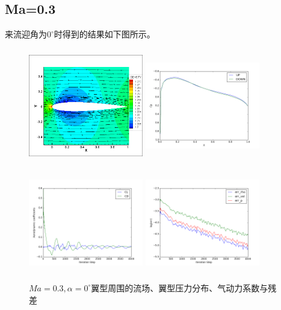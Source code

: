 \documentclass[UTF8]{ctexart}
\begin{document}
\subsection{Ma=0.3}
来流迎角为$0^\circ$时得到的结果如下图所示。
\begin{figure}[htbp]\centering
  \begin{minipage}{5.5cm}
    \centering
    \includegraphics[height=5cm,width=5cm]{../pic/0.3_0_flowfield.png}
  \end{minipage}%
  \begin{minipage}{5.5cm}
    \centering
    \includegraphics[height=5cm,width=5cm]{../pic/0.3_0_Cp.png}
  \end{minipage}

  \begin{minipage}{5.5cm}
    \centering
    \includegraphics[height=5cm,width=5cm]{../pic/0.3_0_cl_cd.png}
  \end{minipage}%
  \begin{minipage}{5.5cm}
    \centering
    \includegraphics[height=5cm,width=5cm]{../pic/0.3_0_residual.png}
  \end{minipage}
  \caption{$Ma=0.3,\alpha=0^\circ$翼型周围的流场、翼型压力分布、气动力系数与残差}
\end{figure}
\end{document}
